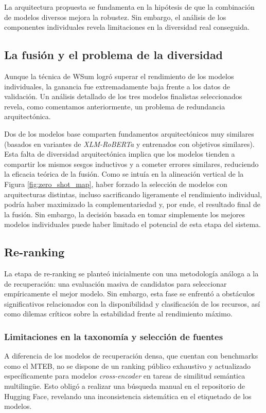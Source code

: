 \noindent La arquitectura propuesta se fundamenta en la hipótesis de que la combinación de modelos diversos mejora la robustez. Sin embargo, el análisis de los componentes individuales revela limitaciones en la diversidad real conseguida.

\subsection{La fusión y el problema de la diversidad}
\noindent Aunque la técnica de \gls{WSum} logró superar el rendimiento de los modelos individuales, la ganancia fue extremadamente baja frente a los datos de validación. Un análisis detallado de los tres modelos finalistas seleccionados revela, como comentamos anteriormente, un problema de redundancia arquitectónica. 

Dos de los modelos base comparten fundamentos arquitectónicos muy similares (basados en variantes de \textit{XLM-RoBERTa} y entrenados con objetivos similares). Esta falta de diversidad arquitectónica implica que los modelos tienden a compartir los mismos sesgos inductivos y a cometer errores similares, reduciendo la eficacia teórica de la fusión. Como se intuía en la alineación vertical de la Figura \ref{fig:zero_shot_map}, haber forzado la selección de modelos con arquitecturas distintas, incluso sacrificando ligeramente el rendimiento individual, podría haber maximizado la complementariedad y, por ende, el resultado final de la fusión. Sin embargo, la decisión basada en tomar simplemente los mejores modelos individuales puede haber limitado el potencial de esta etapa del sistema.

\subsection{Re-ranking}

\noindent La etapa de re-ranking se planteó inicialmente con una metodología análoga a la de recuperación: una evaluación masiva de candidatos para seleccionar empíricamente el mejor modelo. Sin embargo, esta fase se enfrentó a obstáculos significativos relacionados con la disponibilidad y clasificación de los recursos, así como dilemas críticos sobre la estabilidad frente al rendimiento máximo.

\subsubsection{Limitaciones en la taxonomía y selección de fuentes}
\noindent A diferencia de los modelos de recuperación densa, que cuentan con benchmarks como el \gls{MTEB}, no se dispone de un ranking público exhaustivo y actualizado específicamente para modelos \textit{cross-encoder} en tareas de similitud semántica multilingüe. Esto obligó a realizar una búsqueda manual en el repositorio de Hugging Face, revelando una inconsistencia sistemática en el etiquetado de los modelos.

